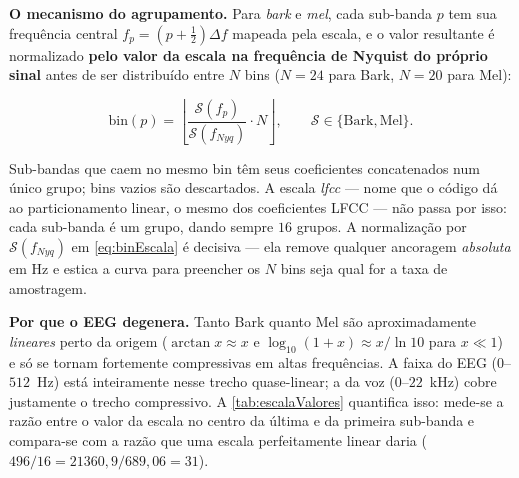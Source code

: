 			\par \textbf{O mecanismo do agrupamento.} Para \textit{bark} e \textit{mel}, cada sub-banda $p$ tem sua frequência central $f_p = (p+\tfrac{1}{2})\Delta f$ mapeada pela escala, e o valor resultante é normalizado \textbf{pelo valor da escala na frequência de Nyquist do próprio sinal} antes de ser distribuído entre $N$ bins ($N=24$ para Bark, $N=20$ para Mel):

			\begin{equation}
				\label{eq:binEscala}
				\text{bin}(p) = \left\lfloor \frac{\mathcal{S}(f_p)}{\mathcal{S}(f_{Nyq})} \cdot N \right\rfloor,
				\qquad \mathcal{S} \in \{\text{Bark}, \text{Mel}\}.
			\end{equation}

			\par Sub-bandas que caem no mesmo bin têm seus coeficientes concatenados num único grupo; bins vazios são descartados. A escala \textit{lfcc} --- nome que o código dá ao particionamento linear, o mesmo dos coeficientes \ac{LFCC} --- não passa por isso: cada sub-banda é um grupo, dando sempre $16$ grupos. A normalização por $\mathcal{S}(f_{Nyq})$ em \autoref{eq:binEscala} é decisiva --- ela remove qualquer ancoragem \emph{absoluta} em Hz e estica a curva para preencher os $N$ bins seja qual for a taxa de amostragem.

			\par \textbf{Por que o EEG degenera.} Tanto Bark quanto Mel são aproximadamente \emph{lineares} perto da origem ($\arctan x \approx x$ e $\log_{10}(1+x) \approx x/\ln 10$ para $x \ll 1$) e só se tornam fortemente compressivas em altas frequências. A faixa do EEG ($0$--$512$~Hz) está inteiramente nesse trecho quase-linear; a da voz ($0$--$22$~kHz) cobre justamente o trecho compressivo. A \autoref{tab:escalaValores} quantifica isso: mede-se a razão entre o valor da escala no centro da última e da primeira sub-banda e compara-se com a razão que uma escala perfeitamente linear daria ($496/16 = 21360{,}9/689{,}06 = 31$).

